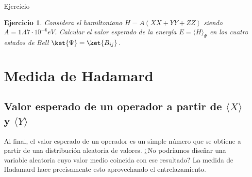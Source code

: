 \documentclass[a4paper,11pt]{book} %
\newtheorem{ejercicio_contador}{Ejercicio}
\newcommand{\Ejercicio}[1]{
		\begin{mybox_gray}{Ejercicio} 
			\begin{ejercicio_contador}
				 #1 
			\end{ejercicio_contador} 
		\end{mybox_gray}
	}
\numberwithin{equation}{chapter}
\begin{document}
	\Ejercicio{Considera el hamiltoniano $H=A(X X+Y Y+Z Z)$ siendo $A=1.47\cdot 10^{-6}eV$. Calcular el 
	valor esperado de la energía $E = \langle H\rangle_\Psi$  en los cuatro estados de Bell 
	$\ket{\Psi} = \ket{B_{ij}}$. }



    \section{Medida de Hadamard}
    
    	\subsection{Valor esperado de un operador a partir de $\langle X \rangle$ y $\langle Y\rangle$}

Al final, el valor esperado de un operador es un simple número que se obtiene a partir de una distribución aleatoria de valores. 
¿No podríamos diseñar una variable aleatoria cuyo valor medio coincida con ese resultado? 
La medida de Hadamard hace precisamente esto aprovechando el entrelazamiento.
\end{document}
